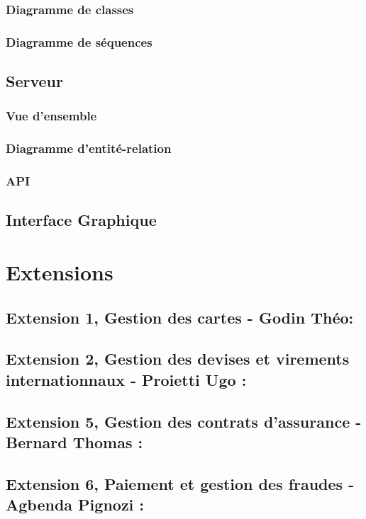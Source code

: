 \documentclass{article}
\begin{document}
				

		\subsubsection{Diagramme de classes}

		\subsubsection{Diagramme de séquences}
	
	\subsection{Serveur}
		\subsubsection{Vue d'ensemble}
		\subsubsection{Diagramme d'entité-relation}
		
		\subsubsection{API}
		
   
    \subsection{Interface Graphique}
	    		

\section{Extensions}
	
	\subsection{Extension 1, Gestion des cartes - Godin Théo: }
	
	\subsection{Extension 2, Gestion des devises et virements internationnaux - Proietti Ugo : }
	
	\subsection{Extension 5, Gestion des contrats d'assurance - Bernard Thomas : }
		
	\subsection{Extension 6, Paiement et gestion des fraudes - Agbenda Pignozi : }
		
\end{document}
